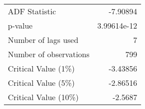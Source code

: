 \begin{tabular}{lr}
\toprule
 ADF Statistic          &  -7.90894     \\
 p-value                &   3.99614e-12 \\
 Number of lags used    &   7           \\
 Number of observations & 799           \\
 Critical Value (1\%)    &  -3.43856     \\
 Critical Value (5\%)    &  -2.86516     \\
 Critical Value (10\%)   &  -2.5687      \\
\bottomrule
\end{tabular}